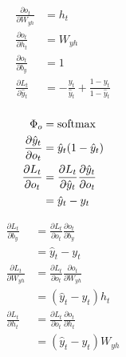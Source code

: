 \documentclass{beamer}
\begin{document}
\begin{frame}
    \begin{equation*}
        \begin{aligned}
            \frac{\partial o_t}{\partial W_{yh}}
            &= h_t \\
            \frac{\partial o_t}{\partial h_t}
            &= W_{yh} \\
            \frac{\partial o_t}{\partial b_y}
            &= 1 \\
            \frac{\partial L_t}{\partial\hat{y}_t}
            &= -\frac{y_t}{\hat{y}_t}+\frac{1-y_t}{1-\hat{y}_t} \\
        \end{aligned}
    \end{equation*}
\end{frame}

\begin{frame}
    \begin{equation*}
        \begin{aligned}
            \Phi_o
            &= {\rm softmax} \\
            \frac{\partial\hat{y}_t}{\partial o_t}
            &= \hat{y}_t(1-\hat{y}_t) \\
            \frac{\partial L_t}{\partial o_t}
            &= \frac{\partial L_t}{\partial\hat{y}_t}\frac{\partial\hat{y}_t}{\partial o_t} \\
            &= \hat{y}_t-y_t \\
        \end{aligned}
    \end{equation*}
\end{frame}

\begin{frame}
    \begin{equation*}
        \begin{aligned}
            \frac{\partial L_t}{\partial b_y}
            &= \frac{\partial L_t}{\partial o_t}\frac{\partial o_t}{\partial b_y} \\
            &= \hat{y}_t-y_t \\
            \frac{\partial L_t}{\partial W_{yh}}
            &= \frac{\partial L_t}{\partial o_t}\frac{\partial o_t}{\partial W_{yh}} \\
            &= (\hat{y}_t-y_t)h_t \\
            \frac{\partial L_t}{\partial h_t}
            &= \frac{\partial L_t}{\partial o_t}\frac{\partial o_t}{\partial h_t} \\
            &= (\hat{y}_t-y_t)W_{yh} \\
        \end{aligned}
    \end{equation*}
\end{frame}
\end{document}
